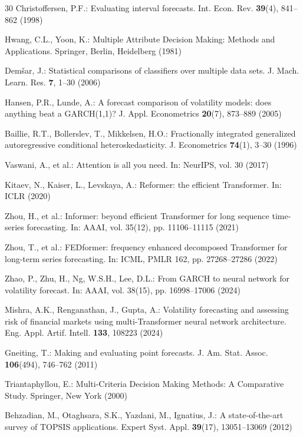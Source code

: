 \documentclass[runningheads]{llncs}
\begin{document}
\begin{thebibliography}{30}
Christoffersen, P.F.: Evaluating interval forecasts.
Int. Econ. Rev. \textbf{39}(4), 841--862 (1998)

Hwang, C.L., Yoon, K.: Multiple Attribute Decision Making: Methods and
Applications. Springer, Berlin, Heidelberg (1981)

Dem\v{s}ar, J.: Statistical comparisons of classifiers over multiple
data sets. J. Mach. Learn. Res. \textbf{7}, 1--30 (2006)

Hansen, P.R., Lunde, A.: A forecast comparison of volatility models:
does anything beat a GARCH(1,1)? J. Appl. Econometrics
\textbf{20}(7), 873--889 (2005)

Baillie, R.T., Bollerslev, T., Mikkelsen, H.O.: Fractionally integrated
generalized autoregressive conditional heteroskedasticity.
J. Econometrics \textbf{74}(1), 3--30 (1996)

Vaswani, A., et al.: Attention is all you need.
In: NeurIPS, vol. 30 (2017)

Kitaev, N., Kaiser, L., Levskaya, A.: Reformer: the efficient
Transformer. In: ICLR (2020)

Zhou, H., et al.: Informer: beyond efficient Transformer for long
sequence time-series forecasting. In: AAAI, vol. 35(12),
pp. 11106--11115 (2021)

Zhou, T., et al.: FEDformer: frequency enhanced decomposed Transformer
for long-term series forecasting. In: ICML, PMLR 162,
pp. 27268--27286 (2022)

Zhao, P., Zhu, H., Ng, W.S.H., Lee, D.L.: From GARCH to neural network
for volatility forecast. In: AAAI, vol. 38(15),
pp. 16998--17006 (2024)

Mishra, A.K., Renganathan, J., Gupta, A.: Volatility forecasting and
assessing risk of financial markets using multi-Transformer neural
network architecture. Eng. Appl. Artif. Intell.
\textbf{133}, 108223 (2024)

Gneiting, T.: Making and evaluating point forecasts.
J. Am. Stat. Assoc. \textbf{106}(494), 746--762 (2011)

Triantaphyllou, E.: Multi-Criteria Decision Making Methods:
A Comparative Study. Springer, New York (2000)

Behzadian, M., Otaghsara, S.K., Yazdani, M., Ignatius, J.:
A state-of-the-art survey of TOPSIS applications.
Expert Syst. Appl. \textbf{39}(17), 13051--13069 (2012)

\end{thebibliography}
\end{document}
